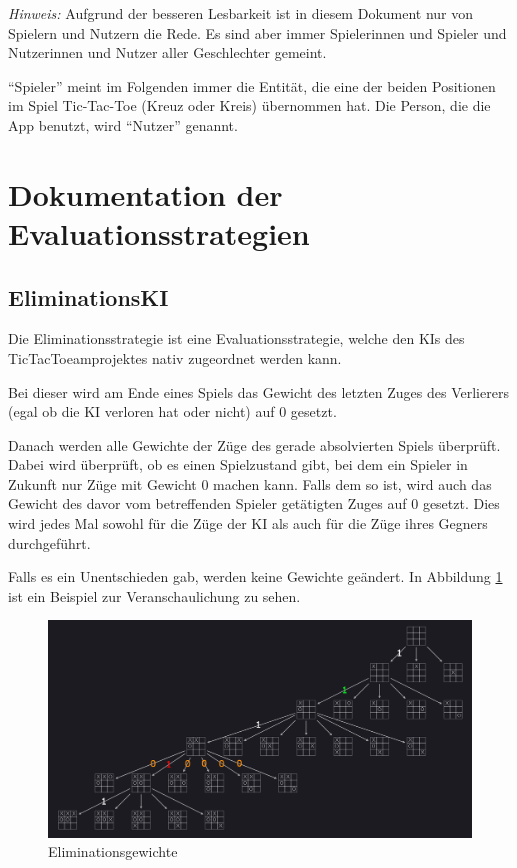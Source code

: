 \documentclass[titlepage]{scrartcl}
\title{\TicTacToe}
\subtitle{Dokumentation}
\date{Stand: \today}
\author{Jonas, Luis, Leonid}
\begin{document}
\maketitle

\emph{Hinweis:} Aufgrund der besseren Lesbarkeit ist in diesem Dokument nur von Spielern und Nutzern die Rede.
Es sind aber immer Spielerinnen und Spieler und Nutzerinnen und Nutzer aller Geschlechter gemeint.

"`Spieler"' meint im Folgenden immer die Entität, die eine der beiden Positionen im Spiel Tic-Tac-Toe (Kreuz oder Kreis) übernommen hat.
Die Person, die die App benutzt, wird "`Nutzer"' genannt.
\section{Dokumentation der Evaluationsstrategien}
\subsection{EliminationsKI}
Die Eliminationsstrategie ist eine Evaluationsstrategie, welche den KIs des TicTacToeamprojektes nativ zugeordnet werden kann.

Bei dieser wird am Ende eines Spiels das Gewicht des letzten Zuges des Verlierers (egal ob die KI verloren hat oder nicht) auf \glqq{}0\grqq{} gesetzt.

Danach werden alle Gewichte der Züge des gerade absolvierten Spiels überprüft. Dabei wird überprüft, ob es einen Spielzustand gibt, bei dem ein Spieler in Zukunft nur Züge mit Gewicht 0 machen kann. Falls dem so ist, wird auch das Gewicht des davor vom betreffenden Spieler getätigten Zuges auf \glqq{}0\grqq{} gesetzt. Dies wird jedes Mal sowohl für die Züge der KI als auch für die Züge ihres Gegners durchgeführt.

Falls es ein Unentschieden gab, werden keine Gewichte geändert. In Abbildung \ref{elimination1} ist ein Beispiel zur Veranschaulichung zu sehen.

\begin{figure}[htb]
\includegraphics[width = \linewidth]{elimination1.png}
\caption{Eliminationsgewichte}
\label{elimination1}
\end{figure}
\end{document}
